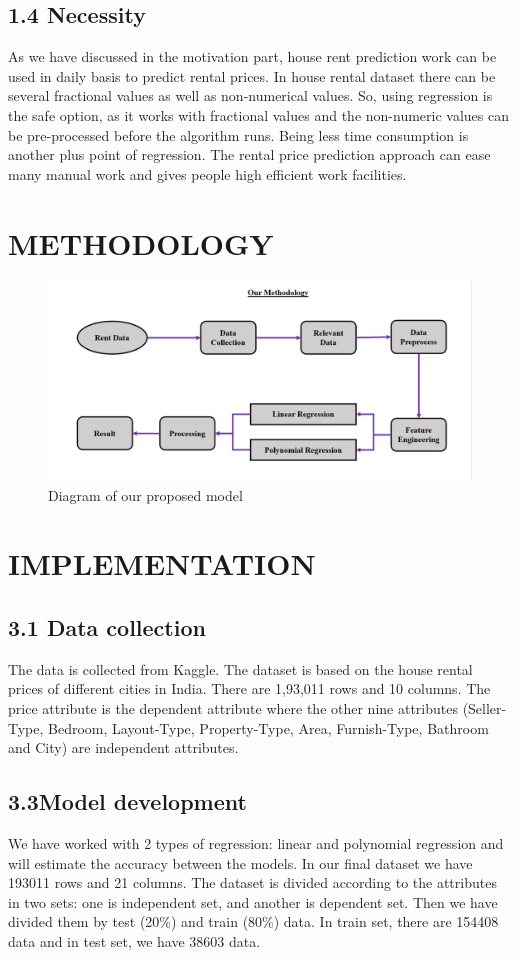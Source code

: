 \documentclass[conference]{IEEEtran}[10]
\begin{document}
\subsection*{1.4 Necessity}
As we have discussed in the motivation part, house rent prediction work can be used in daily basis to predict rental prices. In house rental dataset there can be several fractional values as well as non-numerical values. So, using regression is the safe option, as it works with fractional values and the non-numeric values can be pre-processed before the algorithm runs. Being less time consumption is another plus point of regression. The rental price prediction approach can ease many  manual work and gives people high efficient work facilities. 

\section{METHODOLOGY}
\begin{figure}[H]
\centering
\includegraphics[scale=0.2]{methodology}
\caption{ Diagram of our proposed model}
\end{figure}
\section{IMPLEMENTATION}
\subsection{3.1 Data collection}
The data is collected from Kaggle. The dataset is based on the house rental prices of different cities in India. There are 1,93,011 rows and 10 columns. The price attribute is the dependent attribute where the other nine attributes (Seller-Type, Bedroom, Layout-Type, Property-Type, Area, Furnish-Type, Bathroom and City) are independent attributes.
\subsection{3.3Model development}
We have worked with 2 types of regression: linear and polynomial regression and will estimate the accuracy between the models. In our final dataset we have 193011 rows and 21 columns. The dataset is divided according to the attributes in two sets: one is independent set, and another is dependent set. Then we have divided them by test (20\%) and train (80\%) data. In train set, there are 154408 data and in test set, we have 38603 data.
\end{document}

